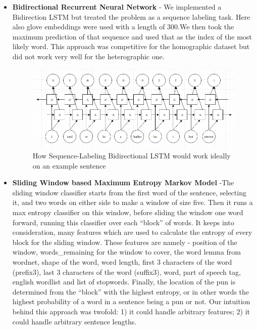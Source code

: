 \documentclass{article}
\begin{document}
\begin{itemize}
    \item \textbf{Bidirectional Recurrent Neural Network} - We implemented a Bidirection LSTM but treated the problem as a sequence labeling task. Here also glove embeddings were used with a length of 300.We then took the maximum prediction of that sequence and used that as the index of the most likely word. This approach was competitive for the homographic dataset but did not work very well for the heterographic one.
    
    \begin{figure}[h!]
    \centering
    \includegraphics[width=110mm]{lstm.png}
    \caption{How Sequence-Labeling Bidirectional LSTM would work ideally on an example sentence}
    \label{fig:method}
    \end{figure}

    \item \textbf{Sliding Window based Maximum Entropy Markov Model} -The sliding window classifier starts from the first word of the sentence, selecting it, and two words on either side to make a window of size five. Then it runs a max entropy classifier on this window, before sliding the window one word forward, running this classifier over each “block” of words. It keeps into consideration, many features which are used to calculate the entropy of every block for the sliding window. These features are namely - position of the window, words\_remaining for the window to cover, the word lemma from wordnet, shape of the word, word length, first 3 characters of the word (prefix3), last 3 characters of the word (suffix3), word, part of speech tag, english wordlist and list of stopwords. Finally, the location of the pun is determined from the “block” with the highest entropy, or in other words the highest probability of a word in a sentence being a pun or not. Our intuition behind this approach was twofold: 1) it could handle arbitrary
features; 2) it could handle arbitrary sentence lengths.


 
\end{itemize}
\end{document}
